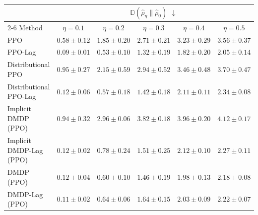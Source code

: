 \begin{tabular}{lccccc}
\toprule
 & \multicolumn{5}{c}{$\mathbb{D}(\hat{\rho}_\eta\|\hat{\rho}_0)$ $\downarrow$} \\
\cmidrule(lr){2-6}
Method & $\eta=0.1$ & $\eta=0.2$ & $\eta=0.3$ & $\eta=0.4$ & $\eta=0.5$ \\
\midrule
PPO & $0.58\pm0.12$ & $1.85\pm0.20$ & $2.71\pm0.21$ & $3.23\pm0.29$ & $3.56\pm0.37$ \\
PPO-Lag & $\bm{0.09\pm0.01}$ & $\bm{0.53\pm0.10}$ & $\bm{1.32\pm0.19}$ & $\bm{1.82\pm0.20}$ & $\bm{2.05\pm0.14}$ \\
Distributional PPO & $0.95\pm0.27$ & $2.15\pm0.59$ & $2.94\pm0.52$ & $3.46\pm0.48$ & $3.70\pm0.47$ \\
Distributional PPO-Lag & $0.12\pm0.06$ & $0.57\pm0.18$ & $1.42\pm0.18$ & $2.11\pm0.11$ & $2.34\pm0.08$ \\
Implicit DMDP (PPO) & $0.94\pm0.32$ & $2.96\pm0.06$ & $3.82\pm0.18$ & $3.96\pm0.20$ & $4.12\pm0.17$ \\
Implicit DMDP-Lag (PPO) & $0.12\pm0.02$ & $0.78\pm0.24$ & $1.51\pm0.25$ & $2.12\pm0.10$ & $2.27\pm0.11$ \\
DMDP (PPO) & $0.12\pm0.04$ & $0.60\pm0.10$ & $1.46\pm0.19$ & $1.98\pm0.13$ & $2.18\pm0.08$ \\
DMDP-Lag (PPO) & $0.11\pm0.02$ & $0.64\pm0.06$ & $1.64\pm0.15$ & $2.03\pm0.09$ & $2.22\pm0.07$ \\
\bottomrule
\end{tabular}
